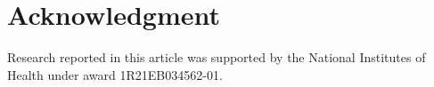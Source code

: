 \documentclass[journal]{IEEEtran}
\begin{document}
\section*{Acknowledgment}
Research reported in this article was supported by the National Institutes of Health under award 1R21EB034562-01. 

\ifCLASSOPTIONcaptionsoff
  \newpage
\fi





%
%
%


\printbibliography

% 
\end{document}
